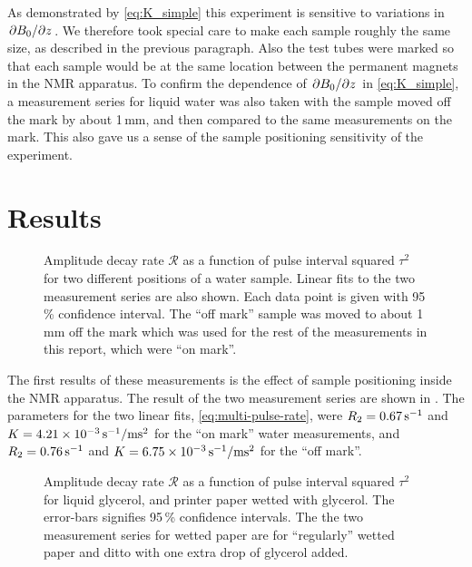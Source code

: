 \documentclass[11pt,a4paper, twocolumn,
swedish, english %
]{article}
\begin{document}
As demonstrated by \eqref{eq:K_simple} this experiment is sensitive to
variations in $\pdv*{B_0}{z}$. We therefore took special care to make
each sample roughly the same size, as described in the previous
paragraph. Also the test tubes were marked so that each sample would 
be at the same location between the permanent magnets in the NMR
apparatus. To confirm the dependence of $\pdv*{B_0}{z}$ in
\eqref{eq:K_simple}, a measurement series for liquid water was also
taken with the sample moved off the mark by about 1\,mm, and then
compared to the same measurements on the mark. This also gave us a
sense of the sample positioning sensitivity of the experiment.



\section{Results}

\begin{figure}
\centering

\caption{Amplitude decay rate $\mathcal{R}$ as a function of pulse
  interval squared $\tau^2$ for two different positions of a water
  sample. Linear fits to the two measurement series are also
  shown. Each data point is given with 95\,\% confidence interval. The
  ``off mark'' sample was moved to about 1\,mm off the mark which was
  used for the rest of the measurements in this report, which were
  ``on mark''. } 
\label{fig:water-pos}
\end{figure}

The first results of these measurements is the effect of sample
positioning inside the NMR apparatus. The result of the two
measurement series are shown in .
The parameters for the two linear fits, \eqref{eq:multi-pulse-rate},
were $R_2=\unit[0.67]{s^{-1}}$ and  
$K=\unit[4.21\times10^{-3}]{s^{-1}/ms^2}$ for the ``on mark'' water
measurements, and $R_2=\unit[0.76]{s^{-1}}$ and
$K=\unit[6.75\times10^{-3}]{s^{-1}/ms^2}$ for the ``off mark''.


\begin{figure}
\centering

\caption{Amplitude decay rate $\mathcal{R}$ as a function of pulse
  interval squared $\tau^2$ for liquid glycerol, and printer paper
  wetted with glycerol. The error-bars signifies 95\,\% confidence
  intervals. The the two measurement series for wetted paper are for
  ``regularly'' wetted paper and ditto with one extra drop of glycerol
  added. }
\label{fig:glyc}
\end{figure}
\end{document}
